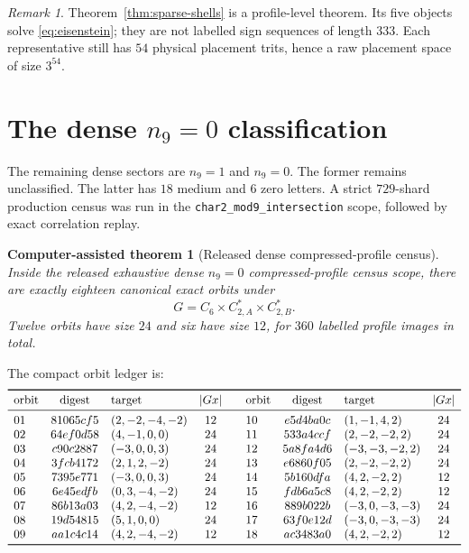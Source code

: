 \documentclass[11pt]{article}
\newtheorem{computationaltheorem}[theorem]{Computer-assisted theorem}
\theoremstyle{remark}
\newtheorem{remark}[theorem]{Remark}
\begin{document}
\begin{remark}
Theorem~\ref{thm:sparse-shells} is a profile-level theorem.  Its five
objects solve \eqref{eq:eisenstein}; they are not labelled sign sequences
of length $333$.  Each representative still has $54$ physical placement
trits, hence a raw placement space of size $3^{54}$.
\end{remark}

\section{The dense $n_9=0$ classification}
\label{sec:dense}

The remaining dense sectors are $n_9=1$ and $n_9=0$.  The former remains
unclassified.  The latter has $18$ medium and $6$ zero letters.  A strict
$729$-shard production census was run in the
\texttt{char2\_mod9\_intersection} scope, followed by exact correlation
replay.

\begin{computationaltheorem}[Released dense compressed-profile census]
\label{thm:dense18}
Inside the released exhaustive dense $n_9=0$ compressed-profile census
scope, there are
exactly eighteen canonical exact orbits under
\[
 G=C_6\times C_{2,A}^{*}\times C_{2,B}^{*}.
\]
Twelve orbits have size $24$ and six have size $12$, for $360$ labelled
profile images in total.
\end{computationaltheorem}

The compact orbit ledger is:
\[
\begin{array}{lclc@{\qquad}lclc}
\toprule
\text{orbit}&\text{digest}&\text{target}&|Gx|&
\text{orbit}&\text{digest}&\text{target}&|Gx|\\
\midrule
01&81065cf5&(2,-2,-4,-2)&12&10&e5d4ba0c&(1,-1,4,2)&24\\
02&64ef0d58&(4,-1,0,0)&24&11&533a4ccf&(2,-2,-2,2)&24\\
03&c90c2887&(-3,0,0,3)&24&12&5a8fa4d6&(-3,-3,-2,2)&24\\
04&3fcb4172&(2,1,2,-2)&24&13&e6860f05&(2,-2,-2,2)&24\\
05&7395e771&(-3,0,0,3)&24&14&5b160dfa&(4,2,-2,2)&12\\
06&6e45edfb&(0,3,-4,-2)&24&15&fdb6a5c8&(4,2,-2,2)&12\\
07&86b13a03&(4,2,-4,-2)&12&16&889b022b&(-3,0,-3,-3)&24\\
08&19d54815&(5,1,0,0)&24&17&63f0e12d&(-3,0,-3,-3)&24\\
09&aa1c4c14&(4,2,-4,-2)&12&18&ac3483a0&(4,2,-2,2)&12\\
\bottomrule
\end{array}
\]
\end{document}

